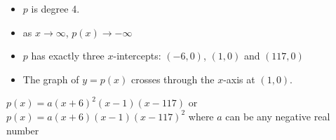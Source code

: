 {\begin{itemize}

\item $p$ is degree 4.
\item as $x \rightarrow \infty$, $p(x) \rightarrow -\infty$
\item $p$ has exactly three $x$-intercepts:  $(-6,0)$, $(1,0)$ and $(117,0)$
\item  The graph of $y=p(x)$ crosses through the $x$-axis at $(1,0)$.

\end{itemize}}
{$p(x) = a(x+6)^2(x-1)(x-117)$ or $p(x) = a(x+6)(x-1)(x-117)^{2}$ where $a$ can be any negative real number
}